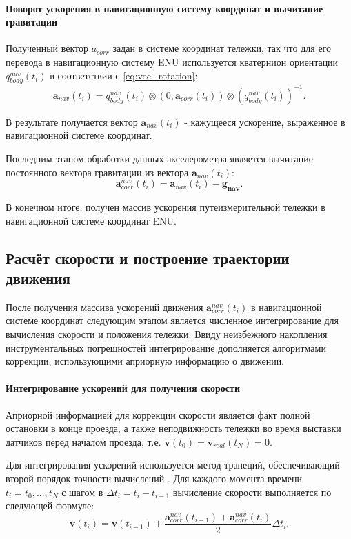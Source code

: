 \paragraph{Поворот ускорения в навигационную систему координат и вычитание гравитации}
Полученный вектор $a_{corr}$ задан в системе координат тележки, так что для его перевода в навигационную систему ENU используется кватернион ориентации $q_{body}^{nav}(t_i)$ в соответствии с \eqref{eq:vec_rotation}:
\begin{equation*}
	\bm{a}_{nav}(t_i) = q_{body}^{nav}(t_i) \otimes (0, \bm{a}_{corr}(t_i)) \otimes (q_{body}^{nav}(t_i))^{-1} \text{.}
\end{equation*}

В результате получается вектор $\bm{a}_{nav}(t_i)$ - кажущееся ускорение, выраженное в навигационной системе координат.

Последним этапом обработки данных акселерометра является вычитание постоянного вектора гравитации из вектора $\bm{a}_{nav}(t_i)$:
\begin{equation*}
	\bm{a}_{corr}^{nav}(t_i) = \bm{a}_{nav}(t_i) - \bm{g_{nav}} \text{.}
\end{equation*}

В конечном итоге, получен массив ускорения путеизмерительной тележки в навигационной системе координат ENU. \\


\subsection{Расчёт скорости и построение траектории движения}
После получения массива ускорений движения $\bm{a}_{corr}^{nav}(t_i)$ в навигационной системе координат следующим этапом является численное интегрирование для вычисления скорости и положения тележки. Ввиду неизбежного накопления инструментальных погрешностей интегрирование дополняется алгоритмами коррекции, использующими априорную информацию о движении.

\paragraph{Интегрирование ускорений для получения скорости}
Априорной информацией для коррекции скорости является факт полной остановки в конце проезда, а также неподвижность тележки во время выставки датчиков перед началом проезда, т.е. $\bm{v}(t_0) = \bm{v}_{real}(t_N) = 0$.

Для интегрирования ускорений используется метод трапеций, обеспечивающий второй порядок точности вычислений \cite{kalitkin}. Для каждого момента времени $t_i = t_0, ..., t_N$ с шагом в $\Delta t_i = t_i - t_{i-1}$ вычисление скорости выполняется по следующей формуле:
\begin{equation}
	\bm{v}(t_i) = \bm{v}(t_{i-1}) + \frac{\bm{a}_{corr}^{nav}(t_{i-1}) + \bm{a}_{corr}^{nav}(t_i)}{2} \Delta t_i \text{.}
\end{equation}

